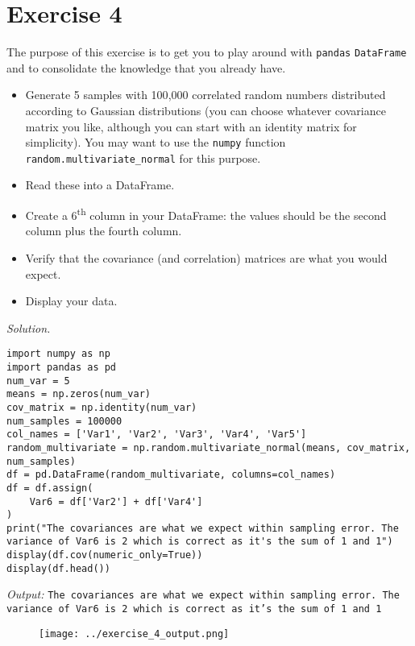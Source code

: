 \documentclass[11pt]{article}
\begin{document}
\section{Exercise 4}
The purpose of this exercise is to get you to play around with \texttt{pandas} \texttt{DataFrame} and to consolidate the knowledge that you already have.
\begin{itemize}
    \item Generate 5 samples with 100{,}000 correlated random numbers distributed according to Gaussian distributions (you can choose whatever covariance matrix you like, although you can start with an identity matrix for simplicity). You may want to use the \texttt{numpy} function \texttt{random.multivariate\_normal} for this purpose.
    \item Read these into a DataFrame.
    \item Create a 6\textsuperscript{th} column in your DataFrame: the values should be the second column plus the fourth column.
    \item Verify that the covariance (and correlation) matrices are what you would expect.
    \item Display your data.
\end{itemize}
\textit{Solution.}
\begin{lstlisting}
import numpy as np
import pandas as pd
num_var = 5
means = np.zeros(num_var)
cov_matrix = np.identity(num_var)
num_samples = 100000
col_names = ['Var1', 'Var2', 'Var3', 'Var4', 'Var5']
random_multivariate = np.random.multivariate_normal(means, cov_matrix, num_samples)
df = pd.DataFrame(random_multivariate, columns=col_names)
df = df.assign(
    Var6 = df['Var2'] + df['Var4']
)
print("The covariances are what we expect within sampling error. The variance of Var6 is 2 which is correct as it's the sum of 1 and 1")
display(df.cov(numeric_only=True))
display(df.head())
\end{lstlisting}
\textit{Output:}
\texttt{The covariances are what we expect within sampling error. The variance of Var6 is 2 which is correct as it's the sum of 1 and 1}
\begin{figure}[h!]
  \centering
  \texttt{[image: ../exercise\_4\_output.png]}
\end{figure}
\end{document}
